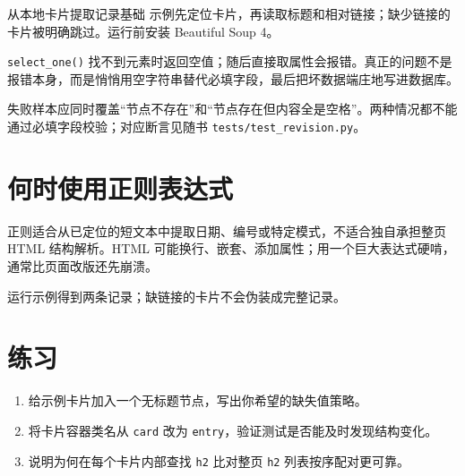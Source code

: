\begin{example}{从本地卡片提取记录}{基础}
示例先定位卡片，再读取标题和相对链接；缺少链接的卡片被明确跳过。运行前安装 Beautiful Soup 4。
\par\medskip
{}
\end{example}

\begin{warning}
\texttt{select\_one()} 找不到元素时返回空值；随后直接取属性会报错。真正的问题不是报错本身，而是悄悄用空字符串替代必填字段，最后把坏数据端庄地写进数据库。
\end{warning}
失败样本应同时覆盖“节点不存在”和“节点存在但内容全是空格”。两种情况都不能通过必填字段校验；对应断言见随书 \texttt{tests/test\_revision.py}。

\section{何时使用正则表达式}
正则适合从已定位的短文本中提取日期、编号或特定模式，不适合独自承担整页 HTML 结构解析。HTML 可能换行、嵌套、添加属性；用一个巨大表达式硬啃，通常比页面改版还先崩溃。

\begin{tcolorbox}[title=本章验收,colframe=Teal,colback=Teal!3]
运行示例得到两条记录；缺链接的卡片不会伪装成完整记录。
\end{tcolorbox}

\section{练习}
\begin{enumerate}[label=\arabic*.]
\item 给示例卡片加入一个无标题节点，写出你希望的缺失值策略。
\item 将卡片容器类名从 \texttt{card} 改为 \texttt{entry}，验证测试是否能及时发现结构变化。
\item 说明为何在每个卡片内部查找 \texttt{h2} 比对整页 \texttt{h2} 列表按序配对更可靠。
\end{enumerate}
